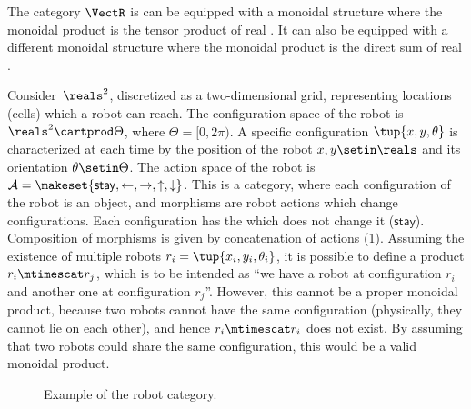 

\begin{example}
    \label{ex:Vect-symmetric-monoidal}
    The category $\VectR$ is can be equipped with a monoidal structure where the monoidal product is the tensor product of real .
    It can also be equipped with a different monoidal structure where the monoidal product is the direct sum of real .
\end{example}


\begin{example}
    \label{ex:robot}
    Consider~$\reals^2$, discretized as a two-dim\-ensional grid, representing locations (cells) which a robot can reach.
    The configuration space of the robot is $\reals^2\cartprod \Theta$, where $\Theta=[0,2\pi)$.
    A specific configuration $\tup{x,y,\theta}$ is characterized at each time by the position of the robot $x,y\setin \reals$ and its orientation $\theta \setin \Theta$.
    The action space of the robot is $\mathcal{A}=\makeset{\mathsf{stay},\leftarrow, \rightarrow, \uparrow, \downarrow}$.
    This is a category, where each configuration of the robot is an object, and morphisms are robot actions which change configurations.
    Each configuration has the  which does not change it ($\mathsf{stay}$).
    Composition of morphisms is given by concatenation of actions (\cref{fig:robotcategory}).
    Assuming the existence of multiple robots $r_i=\tup{x_i,y_i,\theta_i}$, it is possible to define a product $r_i\mtimescat r_j$, which is to be intended as ``we have a robot at configuration $r_i$ and another one at configuration $r_j$''.
    However, this cannot be a proper monoidal product, because two robots cannot have the same configuration (physically, they cannot lie on each other), and hence $r_i\mtimescat r_i$ does not exist.
    By assuming that two robots could share the same configuration, this would be a valid monoidal product.
    \begin{figure}[tbh]
        \centering
        \caption{Example of the robot category. }
        \label{fig:robotcategory}
    \end{figure}
\end{example}

